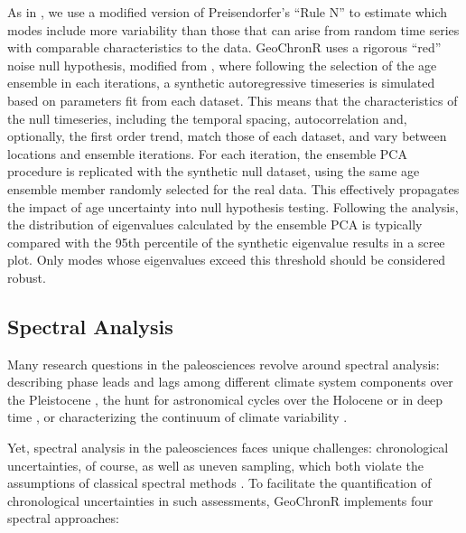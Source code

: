 \documentclass[gchron, manuscript]{copernicus}
\begin{document}
As in \citet{anchukaitis2013mceof}, we use a modified version of Preisendorfer's ``Rule N'' \citep{PreisendorferMobley1988} to estimate which modes include more variability than those that can arise from random time series with comparable characteristics to the data.
GeoChronR uses a rigorous ``red'' noise null hypothesis, modified from \citet{SchneiderNeumaier2001}, where following the selection of the age ensemble in each iterations, a synthetic autoregressive timeseries is simulated based on parameters fit from each dataset.
This means that the characteristics of the null timeseries, including the temporal spacing, autocorrelation and, optionally, the first order trend, match those of each dataset, and vary between locations and ensemble iterations.
For each iteration, the ensemble PCA procedure is replicated with the synthetic null dataset, using the same age ensemble member randomly selected for the real data.
This effectively propagates the impact of age uncertainty into null hypothesis testing.
Following the analysis, the distribution of eigenvalues calculated by the ensemble PCA is typically compared with the 95th percentile of the synthetic eigenvalue results in a scree plot.
Only modes whose eigenvalues exceed this threshold should be considered robust.

\hypertarget{sec:spec_theory}{%
\subsection{Spectral Analysis}\label{sec:spec_theory}}

Many research questions in the paleosciences revolve around spectral analysis: describing phase leads and lags among different climate system components over the Pleistocene \citep[SPECMAP,][]{imbrie1984orbital}, the hunt for astronomical cycles over the Holocene \citep{bond2001} or in deep time \citep{MeyersSageman_2007, Meyers_2012, Meyers_2015}, or characterizing the continuum of climate variability \citep{Huybers_Curry2006, ZhuPNAS2019}.

Yet, spectral analysis in the paleosciences faces unique challenges: chronological uncertainties, of course, as well as uneven sampling, which both violate the assumptions of classical spectral methods \citep{Ghil02}. To facilitate the quantification of chronological uncertainties in such assessments, GeoChronR implements four spectral approaches:
\end{document}
